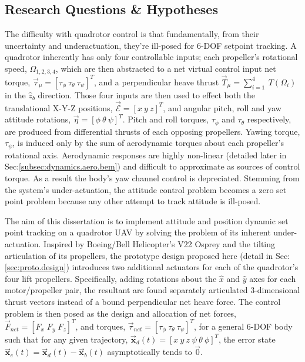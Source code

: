 \subsection{Research Questions \& Hypotheses}
\label{subsec:intro.foreword.hypotheses}
The difficulty with quadrotor control is that fundamentally, from their uncertainty and underactuation, they're ill-posed for 6-DOF setpoint tracking. A quadrotor inherently has only four controllable inputs; each propeller's rotational speed, $\Omega_{1,2,3,4}$, which are then abstracted to a net virtual control input net torque, $\vec{\tau}_\mu=[\tau_{\phi}~\tau_{\theta}~\tau_{\psi}]^T$, and a perpendicular heave thrust $\vec{T}_\mu=\sum_{i=1}^{4}~T(\Omega_i)$ in the $\hat{z}_b$ direction. Those four inputs are then used to effect both the translational X-Y-Z positions, $\vec{\mathcal{E}}=[x~y~z]^T$, and angular pitch, roll and yaw attitude rotations, $\vec{\eta}=[\phi~\theta~\psi]^T$. Pitch and roll torques, $\tau_{\phi}$ and $\tau_{\theta}$ respectively, are produced from differential thrusts of each opposing propellers. Yawing torque, $\tau_{\psi}$, is induced only by the sum of aerodynamic torques about each propeller's rotational axis. Aerodynamic responses are highly non-linear (detailed later in Sec:\ref{subsec:dynamics.aero.bem}) and difficult to approximate as sources of control torque. As a result the body's yaw channel control is depreciated. Stemming from the system's under-actuation, the attitude control problem becomes a zero set point problem because any other attempt to track attitude is ill-posed.
\par
The aim of this dissertation is to implement attitude and position dynamic set point tracking on a quadrotor UAV by solving the problem of its inherent under-actuation. Inspired by Boeing/Bell Helicopter's V22 Osprey and the tilting articulation of its propellers, the prototype design proposed here (detail in Sec:\ref{sec:proto.design}) introduces two additional actuators for each of the quadrotor's four lift propellers. Specifically, adding rotations about the $\hat{x}$ and $\hat{y}$ axes for each motor/propeller pair, the resultant are found separately articulated 3-dimensional thrust vectors instead of a bound perpendicular net heave force. The control problem is then posed as the design and allocation of net forces, $\vec{F}_{net} = [F_x\;F_y\;F_z]^T$, and torques, $\vec{\tau}_{net} = [\tau_{\phi}~\tau_{\theta}~\tau_{\psi}]^T$, for a general 6-DOF body such that for any given trajectory, $\vec{\mathbf{x}}_d(t)=[x~y~z~\psi~\theta~\phi]^T$, the error state $\vec{\mathbf{x}}_e(t) = \vec{\mathbf{x}}_d(t) - \vec{\mathbf{x}}_b(t)$ asymptotically tends to $\vec{0}$.
